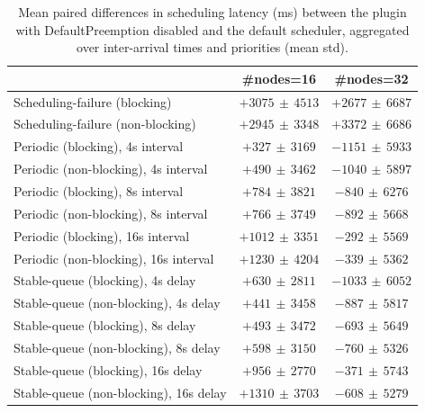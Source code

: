 \begin{table}[t]
\tiny
\setlength{\tabcolsep}{1.2pt}
\renewcommand{\arraystretch}{1.12}
\centering
\caption{Mean paired differences in scheduling latency (ms) between the plugin with DefaultPreemption disabled and the default scheduler, aggregated over inter-arrival times and priorities (mean \pm std).}
\label{tab:latency-defpreempt0-std1-agg-arrival-prio}
\begin{tabular}{l c c}
\toprule
 & \#nodes=16 & \#nodes=32 \\
\midrule
Scheduling-failure (blocking) & $+3075\,\pm\,4513$ & $+2677\,\pm\,6687$ \\
Scheduling-failure (non-blocking) & $+2945\,\pm\,3348$ & $+3372\,\pm\,6686$ \\
Periodic (blocking), 4s interval & $+327\,\pm\,3169$ & $-1151\,\pm\,5933$ \\
Periodic (non-blocking), 4s interval & $+490\,\pm\,3462$ & $-1040\,\pm\,5897$ \\
Periodic (blocking), 8s interval & $+784\,\pm\,3821$ & $-840\,\pm\,6276$ \\
Periodic (non-blocking), 8s interval & $+766\,\pm\,3749$ & $-892\,\pm\,5668$ \\
Periodic (blocking), 16s interval & $+1012\,\pm\,3351$ & $-292\,\pm\,5569$ \\
Periodic (non-blocking), 16s interval & $+1230\,\pm\,4204$ & $-339\,\pm\,5362$ \\
Stable-queue (blocking), 4s delay & $+630\,\pm\,2811$ & $-1033\,\pm\,6052$ \\
Stable-queue (non-blocking), 4s delay & $+441\,\pm\,3458$ & $-887\,\pm\,5817$ \\
Stable-queue (blocking), 8s delay & $+493\,\pm\,3472$ & $-693\,\pm\,5649$ \\
Stable-queue (non-blocking), 8s delay & $+598\,\pm\,3150$ & $-760\,\pm\,5326$ \\
Stable-queue (blocking), 16s delay & $+956\,\pm\,2770$ & $-371\,\pm\,5743$ \\
Stable-queue (non-blocking), 16s delay & $+1310\,\pm\,3703$ & $-608\,\pm\,5279$ \\
\bottomrule
\end{tabular}
\end{table}
